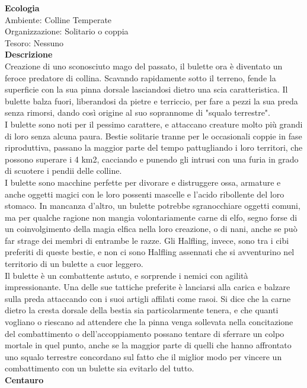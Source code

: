 \begin{multicols}{2}
\textbf{Ecologia}\\
Ambiente: Colline Temperate\\
Organizzazione: Solitario o coppia\\
Tesoro: Nessuno\\
\textbf{Descrizione}\\
Creazione di uno sconosciuto mago del passato, il bulette ora è diventato un feroce predatore di collina. Scavando rapidamente sotto il terreno, fende la superficie con la sua pinna dorsale lasciandosi dietro una scia caratteristica. Il bulette balza fuori, liberandosi da pietre e terriccio, per fare a pezzi la sua preda senza rimorsi, dando così origine al suo soprannome di "squalo terrestre".\\
I bulette sono noti per il pessimo carattere, e attaccano creature molto più grandi di loro senza alcuna paura. Bestie solitarie tranne per le occasionali coppie in fase riproduttiva, passano la maggior parte del tempo pattugliando i loro territori, che possono superare i 4 km2, cacciando e punendo gli intrusi con una furia in grado di scuotere i pendii delle colline.\\
I bulette sono macchine perfette per divorare e distruggere ossa, armature e anche oggetti magici con le loro possenti mascelle e l'acido ribollente del loro stomaco. In mancanza d'altro, un bulette potrebbe sgranocchiare oggetti comuni, ma per qualche ragione non mangia volontariamente carne di elfo, segno forse di un coinvolgimento della magia elfica nella loro creazione, o di nani, anche se può far strage dei membri di entrambe le razze. Gli Halfling, invece, sono tra i cibi preferiti di queste bestie, e non ci sono Halfling assennati che si avventurino nel territorio di un bulette a cuor leggero.\\
Il bulette è un combattente astuto, e sorprende i nemici con agilità impressionante. Una delle sue tattiche preferite è lanciarsi alla carica e balzare sulla preda attaccando con i suoi artigli affilati come rasoi. Si dice che la carne dietro la cresta dorsale della bestia sia particolarmente tenera, e che quanti vogliano o riescano ad attendere che la pinna venga sollevata nella concitazione del combattimento o dell'accoppiamento possano tentare di sferrare un colpo mortale in quel punto, anche se la maggior parte di quelli che hanno affrontato uno squalo terrestre concordano sul fatto che il miglior modo per vincere un combattimento con un bulette sia evitarlo del tutto.\\


\medskip{}\textbf{Centauro}


\end{multicols}
